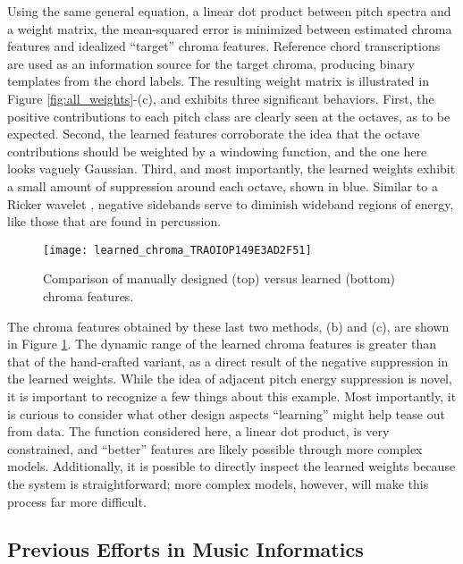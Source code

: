 Using the same general equation, a linear dot product between pitch spectra and a weight matrix, the mean-squared error is minimized between estimated chroma features and idealized ``target'' chroma features.
Reference chord transcriptions are used as an information source for the target chroma, producing binary templates from the chord labels.
The resulting weight matrix is illustrated in Figure \ref{fig:all_weights}-(c), and exhibits three significant behaviors.
First, the positive contributions to each pitch class are clearly seen at the octaves, as to be expected.
Second, the learned features corroborate the idea that the octave contributions should be weighted by a windowing function, and the one here looks vaguely Gaussian.
Third, and most importantly, the learned weights exhibit a small amount of suppression around each octave, shown in blue.
Similar to a Ricker wavelet \cite{Vaidyanathan1993Multirate}, negative sidebands serve to diminish wideband regions of energy, like those that are found in percussion.


\begin{figure}
\begin{centering}
\texttt{[image: learned\_chroma\_TRAOIOP149E3AD2F51]}
\caption{Comparison of manually designed (top) versus learned (bottom) chroma features.}
\label{fig:learned_chroma}
\end{centering}
\end{figure}

The chroma features obtained by these last two methods, (b) and (c), are shown in Figure \ref{fig:learned_chroma}.
The dynamic range of the learned chroma features is greater than that of the hand-crafted variant, as a direct result of the negative suppression in the learned weights.
While the idea of adjacent pitch energy suppression is novel, it is important to recognize a few things about this example.
Most importantly, it is curious to consider what other design aspects ``learning'' might help tease out from data.
The function considered here, a linear dot product, is very constrained, and ``better'' features are likely possible through more complex models.
Additionally, it is possible to directly inspect the learned weights because the system is straightforward; more complex models, however, will make this process far more difficult.


\subsection{Previous Efforts in Music Informatics}

